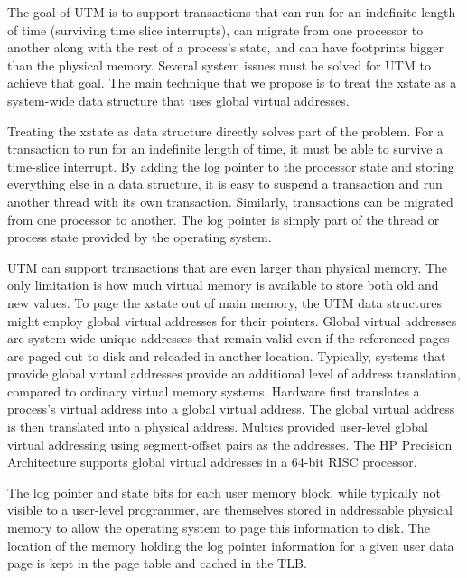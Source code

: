 
The goal of UTM is to support transactions that can run for an
indefinite length of time (surviving time slice interrupts), can
migrate from one processor to another along with the rest of a
process's state, and can have footprints bigger than the physical
memory.  Several system issues must be solved for UTM to achieve that
goal.  The main technique that we propose is to treat the xstate as
a system-wide data structure that uses global virtual addresses.

Treating the xstate as data structure directly solves part of the
problem.  For a transaction to run for an indefinite length of time,
it must be able to survive a time-slice interrupt.  By adding the
log pointer to the processor state and storing everything else in a
data structure, it is easy to suspend a transaction and run another
thread with its own transaction.  Similarly, transactions can be
migrated from one processor to another.  The log pointer is
simply part of the thread or process state provided by the operating
system.

UTM can support transactions that are even larger than physical
memory.  The only limitation is how much virtual memory is available
to store both old and new values.  
To page the xstate out of main
memory, the UTM data structures might employ global virtual addresses for
their pointers.  Global virtual addresses are system-wide unique
addresses that remain valid even if the referenced pages are paged out
to disk and reloaded in another location.  Typically, systems that
provide global virtual addresses provide an additional level of
address translation, compared to ordinary virtual memory systems.
Hardware first translates a process's virtual address into a global
virtual address.  The global virtual address is then translated into a
physical address.  Multics \cite{BensoussanClDa72} provided user-level
global virtual addressing using segment-offset pairs as the addresses.
The HP Precision Architecture \cite{Lee89} supports global virtual
addresses in a 64-bit RISC processor.

The log pointer and state bits for each user memory block,
while typically not visible to a user-level programmer, are
themselves stored in addressable physical memory to allow the
operating system to page this information to disk.  The location of
the memory holding the log pointer information for a given user data
page is kept in the page table and cached in the TLB.


